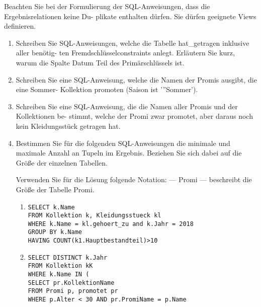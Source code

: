 \documentclass{lehramt-informatik-aufgabe}
\begin{document}
Beachten Sie bei der Formulierung der SQL-Anweisungen, dass die
Ergebnisrelationen keine Du- plikate enthalten dürfen. Sie dürfen
geeignete Views definieren.
\begin{enumerate}


\item Schreiben Sie SQL-Anweisungen, welche die Tabelle hat\_getragen
inklusive aller benötig- ten Fremdschlüsselconstraints anlegt. Erläutern
Sie kurz, warum die Spalte Datum Teil des Primärschlüssels ist.


\item Schreiben Sie eine SQL-Anweisung, welche die Namen der Promis
ausgibt, die eine Sommer- Kollektion promoten (Saison ist ’”Sommer’).


\item Schreiben Sie eine SQL-Anweisung, die die Namen aller Promis und
der Kollektionen be- stimmt, welche der Promi zwar promotet, aber daraus
noch kein Kleidungsstück getragen hat.


\item Bestimmen Sie für die folgenden SQL-Anweisungen die minimale und
maximale Anzahl an Tupeln im Ergebnis. Beziehen Sie sich dabei auf die
Größe der einzelnen Tabellen.

Verwenden Sie für die Lösung folgende Notation:
— Promi — beschreibt die Größe der Tabelle Promi.

\begin{enumerate}


\item

\begin{verbatim}
SELECT k.Name
FROM Kollektion k, Kleidungsstueck kl
WHERE k.Name = kl.gehoert_zu and k.Jahr = 2018
GROUP BY k.Name
HAVING COUNT(k1.Hauptbestandteil)>10
\end{verbatim}


\item

\begin{verbatim}
SELECT DISTINCT k.Jahr
FROM Kollektion kK
WHERE k.Name IN (
SELECT pr.KollektionName
FROM Promi p, promotet pr
WHERE p.Alter < 30 AND pr.PromiName = p.Name
\end{verbatim}
\end{enumerate}


\end{enumerate}
\end{document}
